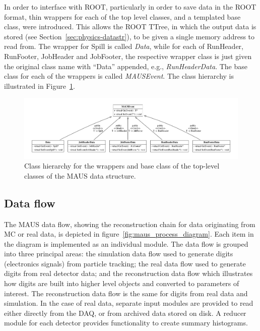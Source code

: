\documentclass[11pt]{article}
\begin{document}
In order to interface with ROOT, particularly in order to save data in the ROOT format, thin wrappers for each of the top level classes, and a templated base class, were introduced. This allows the ROOT TTree, in which the output data is stored (see Section~\ref{sec:physics-datastr}), to be given a single memory address to read from. The wrapper for Spill is called \emph{Data}, while for each of RunHeader, RunFooter, JobHeader and JobFooter, the respective wrapper class is just given the original class name with ``Data'' appended, e.g., \emph{RunHeaderData}. The base class for each of the wrappers is called \emph{MAUSEvent}. The class hierarchy is illustrated in Figure~\ref{fig:top-level}.

\begin{figure}[htb]
\centering
\includegraphics[width=1.03\textwidth]{figs/top_level.pdf}
\caption{Class hierarchy for the wrappers and base class of the top-level classes of the MAUS data structure.}
\label{fig:top-level}
\end{figure}

\subsection{Data flow}\label{sec:maus-dataflow}

The MAUS data flow, showing the reconstruction chain for data originating from MC or real data, is depicted in figure~\ref{fig:maus_process_diagram}. Each item in the diagram is implemented as an individual module. The data flow is grouped into three principal areas: the simulation data flow used to generate digits (electronics signals) from particle tracking; the real data flow used to generate digits from real detector data; and the reconstruction data flow which illustrates how digits are built into higher level objects and converted to parameters of interest. The reconstruction data flow is the same for digits from real data and simulation.  In the case of real data, separate input modules are provided to read either directly from the DAQ, or from archived data stored on disk. A reducer module for each detector provides functionality to create summary histograms.
\end{document}
